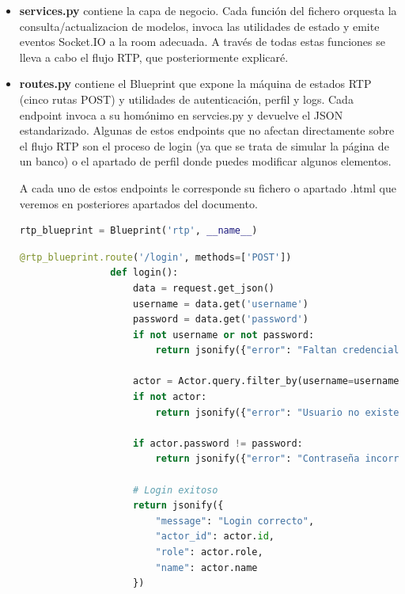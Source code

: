 \begin{itemize}
\begin{lstlisting}[language=Python, style=custom]
            \end{lstlisting}
    
    \item \textbf{services.py} contiene la capa de negocio. Cada función del fichero orquesta la consulta/actualizacion de modelos, invoca las utilidades de estado y emite eventos Socket.IO a la room adecuada.
            A través de todas estas funciones se lleva a cabo el flujo RTP, que posteriormente explicaré.
    
    \item \textbf{routes.py} contiene el Blueprint que expone la máquina de estados RTP (cinco rutas POST) y utilidades de autenticación, perfil y logs. Cada endpoint invoca a su homónimo en servcies.py y devuelve el JSON estandarizado.
            Algunas de estos endpoints que no afectan directamente sobre el flujo RTP son el proceso de login (ya que se trata de simular la página de un banco) o el apartado de perfil donde puedes modificar algunos elementos.

            A cada uno de estos endpoints le corresponde su fichero o apartado .html que veremos en posteriores apartados del documento.
            
            \begin{lstlisting}[language=Python, style=custom]
                rtp_blueprint = Blueprint('rtp', __name__)
            \end{lstlisting}

            \begin{lstlisting}[language=Python, style=custom]
                @rtp_blueprint.route('/login', methods=['POST'])
                def login():
                    data = request.get_json()
                    username = data.get('username')
                    password = data.get('password')
                    if not username or not password:
                        return jsonify({"error": "Faltan credenciales"}), 400
                    
                    actor = Actor.query.filter_by(username=username).first()
                    if not actor:
                        return jsonify({"error": "Usuario no existe"}), 404
                    
                    if actor.password != password:
                        return jsonify({"error": "Contraseña incorrecta"}), 401
                    
                    # Login exitoso
                    return jsonify({
                        "message": "Login correcto",
                        "actor_id": actor.id,
                        "role": actor.role,
                        "name": actor.name
                    })
            \end{lstlisting}


\end{itemize}
